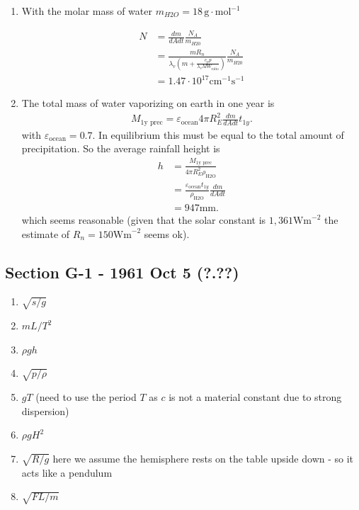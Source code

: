 \documentclass[10pt,a4paper]{book}
\theoremstyle{definition}
\begin{document}
\begin{enumerate}[label=(\alph*)]
\item With the molar mass of water $m_{H2O}=18\,\text{g}\cdot\text{mol}^{-1}$

\begin{align}
    N&=\frac{dm}{dA dt} \frac{N_A}{m_{H20}}\\
    &=\frac{m R_n}{\lambda_v(m+\frac{c_p p}{\lambda_v MW_\text{ratio}})}\frac{N_A}{m_{H20}}\\
    &=1.47\cdot10^{17}\text{cm}^{-1}\text{s}^{-1}
\end{align}

\item The total mass of water vaporizing on earth in one year is
\begin{align}
    M_\text{1y prec}=\varepsilon_\text{ocean} 4\pi R_E^2  \frac{dm}{dA dt} t_{1y}.
\end{align}
with $\varepsilon_\text{ocean}=0.7$. In equilibrium this must be equal to the total amount of precipitation. So the average rainfall height is 
\begin{align}
    h&=\frac{M_\text{1y prec}}{4\pi R_E^2\rho_\text{H2O}}\\
    &=\frac{\varepsilon_\text{ocean}t_{1y}}{\rho_\text{H2O}} \frac{dm}{dA dt}\\
    &=947\text{mm}.
\end{align}
which seems reasonable (given that the solar constant is $1,361\text{Wm}^{-2}$ the estimate of $R_n=150\text{Wm}^{-2}$ seems ok).
\end{enumerate}

\subsection{Section G-1 - 1961 Oct 5 (?.??)}
\begin{enumerate}[label=(\alph*)]
    \item $\sqrt{s/g}$
    \item $mL/T^2$
    \item $\rho g h$
    \item $\sqrt{p/\rho}$
    \item $gT$ (need to use the period $T$ as $c$ is not a material constant due to strong dispersion)
    \item $\rho g H^2$
    \item $\sqrt{R/g}$ here we assume the hemisphere rests on the table upside down - so it acts like a pendulum 
    \item $\sqrt{FL/m}$
\end{enumerate}
\end{document}
